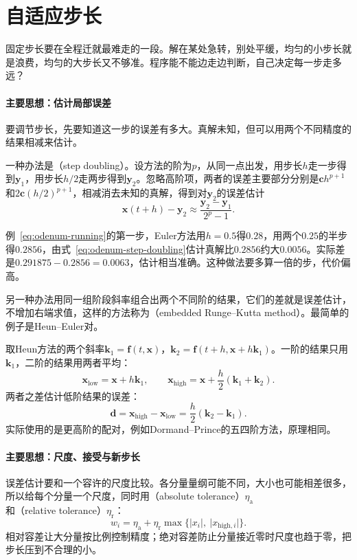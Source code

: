 \section{自适应步长}
\label{sec:odenum-adaptive}

固定步长要在全程迁就最难走的一段。解在某处急转，别处平缓，均匀的小步长就是浪费，均匀的大步长又不够准。程序能不能边走边判断，自己决定每一步走多远？

\paragraph{主要思想：估计局部误差}
要调节步长，先要知道这一步的误差有多大。真解未知，但可以用两个不同精度的结果相减来估计。

一种办法是（step doubling）。设方法的阶为$p$，从同一点出发，用步长$h$走一步得到$\bm{y}_1$，用步长$h/2$走两步得到$\bm{y}_2$。忽略高阶项，两者的误差主要部分分别是$\bm{c}h^{p+1}$和$2\bm{c}(h/2)^{p+1}$，相减消去未知的真解，得到对$\bm{y}_2$的误差估计
\begin{equation}
 \bm{x}(t+h)-\bm{y}_2\approx\frac{\bm{y}_2-\bm{y}_1}{2^{p}-1}.
 \label{eq:odenum-step-doubling}
\end{equation}

例~\eqref{eq:odenum-running}的第一步，Euler方法用$h=0.5$得$0.28$，用两个$0.25$的半步得$0.2856$，由式~\eqref{eq:odenum-step-doubling}估计真解比$0.2856$约大$0.0056$。实际差是$0.291875-0.2856=0.0063$，估计相当准确。这种做法要多算一倍的步，代价偏高。

另一种办法用同一组阶段斜率组合出两个不同阶的结果，它们的差就是误差估计，不增加右端求值，这样的方法称为（embedded Runge--Kutta method）。最简单的例子是Heun--Euler对。

取Heun方法的两个斜率$\bm{k}_1=\bm{f}(t,\bm{x})$，$\bm{k}_2=\bm{f}(t+h,\bm{x}+h\bm{k}_1)$。一阶的结果只用$\bm{k}_1$，二阶的结果用两者平均：
\[
 \bm{x}_{\mathrm{low}}=\bm{x}+h\bm{k}_1,\qquad
 \bm{x}_{\mathrm{high}}=\bm{x}+\frac{h}{2}(\bm{k}_1+\bm{k}_2).
\]
两者之差估计低阶结果的误差：
\begin{equation}
 \bm{d}=\bm{x}_{\mathrm{high}}-\bm{x}_{\mathrm{low}}=\frac{h}{2}(\bm{k}_2-\bm{k}_1).
 \label{eq:odenum-embedded-estimate}
\end{equation}
实际使用的是更高阶的配对，例如Dormand--Prince的五四阶方法，原理相同。

\paragraph{主要思想：尺度、接受与新步长}
误差估计要和一个容许的尺度比较。各分量量纲可能不同，大小也可能相差很多，所以给每个分量一个尺度，同时用（absolute tolerance）$\eta_{\mathrm{a}}$和（relative tolerance）$\eta_{\mathrm{r}}$：
\begin{equation}
 w_i=\eta_{\mathrm{a}}+\eta_{\mathrm{r}}\max\bigl\{\lvert x_i\rvert,\ \lvert x_{\mathrm{high},i}\rvert\bigr\}.
 \label{eq:odenum-scale}
\end{equation}
相对容差让大分量按比例控制精度；绝对容差防止分量接近零时尺度也趋于零，把步长压到不合理的小。

